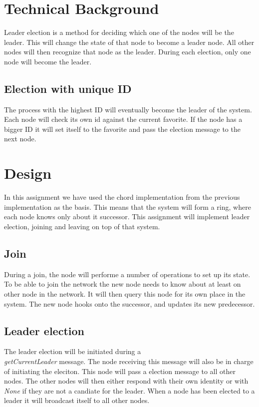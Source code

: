 \section{Technical Background}
Leader election is a method for deciding which one of the nodes will be the leader. This will change the state of that node to become a leader node.
All other nodes will then recognize that node as the leader. During each election, only one node will become the leader.

\subsection{Election with unique ID}
The process with the highest ID will eventually become the leader of the system. Each node will check its own id against the current
favorite. If the node has a bigger ID it will set itself to the favorite and pass the election message to the next node.

\section{Design}
In this assignment we have used the chord implementation from the previous implementation as the basis.
This means that the system will form a ring, where each node knows only about it successor.
This assignment will implement leader election, joining and leaving on top of that system.
\subsection{Join}
During a join, the node will performe a number of operations to set up its state. 
To be able to join the network the new node needs to know about at least on other node in the network.
It will then query this node for its own place in the system.
The new node hooks onto the successor, and updates its new predecessor.

\subsection{Leader election}
The leader election will be initiated during a \textit{\\getCurrentLeader} message. The node receiving this message will also be in charge
of initiating the eleciton. This node will pass a election message to all other nodes. The other nodes will then either respond with their own identity or with \textit{None} if they are not a candiate for the leader. When a node has been elected to a leader it will broadcast itself to all other nodes.

